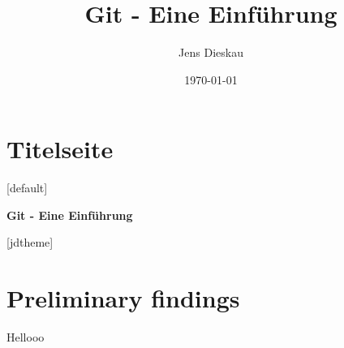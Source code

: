 \documentclass{beamer}
\title{Git - Eine Einführung}
\author{Jens Dieskau}
\date{\today}
\begin{document}

\section{Titelseite}

[default]

\begin{frame}
 \begin{center}
   \textcolor{uigreen_dark}{
     \textbf{
       \Huge Git - Eine Einführung
     }
   }
  \end{center}

\end{frame}

%
[jdtheme]
\section{Preliminary findings}
\begin{frame}
 \begin{center}
   \textcolor{uigreen}{
     \Huge Hellooo
   }
  \end{center}
\end{frame}
\end{document}
